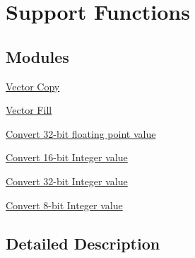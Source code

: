 \hypertarget{group__group_support}{\section{Support Functions}
\label{group__group_support}
}
\subsection*{Modules}
\begin{DoxyCompactItemize}
\item 
\hyperlink{group__copy}{Vector Copy}
\item 
\hyperlink{group___fill}{Vector Fill}
\item 
\hyperlink{group__float__to__x}{Convert 32-\/bit floating point value}
\item 
\hyperlink{group__q15__to__x}{Convert 16-\/bit Integer value}
\item 
\hyperlink{group__q31__to__x}{Convert 32-\/bit Integer value}
\item 
\hyperlink{group__q7__to__x}{Convert 8-\/bit Integer value}
\end{DoxyCompactItemize}


\subsection{Detailed Description}
